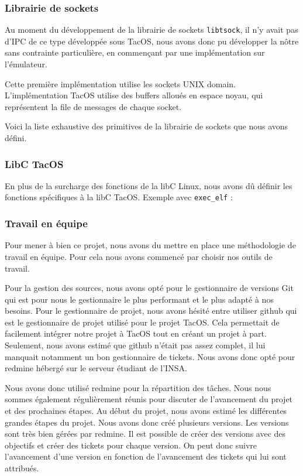 \subsubsection{Librairie de sockets}

Au moment du développement de la librairie de sockets \verb|libtsock|, il n'y avait pas d'IPC de ce type développée sous TacOS, nous avons donc pu développer la nôtre sans contrainte particulière, en commençant par une implémentation sur l'émulateur.

Cette première implémentation utilise les sockets UNIX domain. L'implémentation TacOS utilise des buffers alloués en espace noyau, qui représentent la file de messages de chaque socket.

Voici la liste exhaustive des primitives de la librairie de sockets que nous avons défini.



\subsubsection{LibC TacOS}

En plus de la surcharge des fonctions de la libC Linux, nous avons dû définir les fonctions spécifiques à la libC TacOS. Exemple avec \verb|exec_elf| :


\subsubsection{Travail en équipe}

Pour mener à bien ce projet, nous avons du mettre en place une méthodologie de travail en équipe.
Pour cela nous avons commencé par choisir nos outils de travail.

Pour la gestion des sources, nous avons opté pour le gestionnaire de versions Git qui est pour nous le gestionnaire le plus performant et le plus adapté à nos besoins.
Pour le gestionnaire de projet, nous avons hésité entre utiliser github qui est le gestionnaire de projet utilisé pour le projet TacOS.
Cela permettait de facilement intégrer notre projet à TacOS tout en créant un projet à part.
Seulement, nous avons estimé que github n'était pas assez complet, il lui manquait notamment un bon gestionnaire de tickets.
Nous avons donc opté pour redmine hébergé sur le serveur étudiant de l'INSA.

Nous avons donc utilisé redmine pour la répartition des tâches.
Nous nous sommes également régulièrement réunis pour discuter de l'avancement du projet et des prochaines étapes.
Au début du projet, nous avons estimé les différentes grandes étapes du projet.
Nous avons donc créé plusieurs versions.
Les versions sont très bien gérées par redmine.
Il est possible de créer des versions avec des objectifs et créer des tickets pour chaque version.
On peut donc suivre l'avancement d'une version en fonction de l'avancement des tickets qui lui sont attribués.

